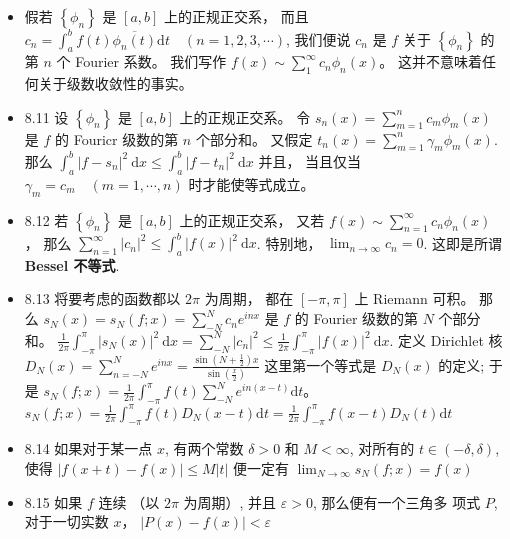 \begin{itemize}
\item 假若 $\left\{\phi_{n}\right\}$ 是 $[a, b]$ 上的正规正交系， 而且 $c_{n}=\int_{a}^{b} f(t) \overline{\phi_{n}(t)} \mathrm{d} t \quad(n=1,2,3, \cdots)$, 我们便说 $c_{n}$ 是 $f$ 关于 $\left\{\phi_{n}\right\}$ 的第 $n$ 个 Fourier 系数。 我们写作 $f(x) \sim \sum_{1}^{\infty} c_{n} \phi_{n}(x)$。 这并不意味着任何关于级数收敛性的事实。

\item 8.11 设 $\left\{\phi_{n}\right\}$ 是 $[a, b]$ 上的正规正交系。 令 $s_{n}(x)=\sum_{m=1}^{n} c_{m} \phi_{m}(x)$ 是 $f$ 的 Fouricr 级数的第 $n$ 个部分和。 又假定 $t_{n}(x)=\sum_{m=1}^{n} \gamma_{m} \phi_{m}(x) .$ 那么 $\int_{a}^{b}\left|f-s_{n}\right|^{2} \mathrm{~d} x \leqslant \int_{a}^{b}\left|f-t_{n}\right|^{2} \mathrm{~d} x$ 并且， 当且仅当 $\gamma_{m}=c_{m} \quad(m=1, \cdots, n)$ 时才能使等式成立。

\item 8.12 若 $\left\{\phi_{n}\right\}$ 是 $[a, b]$ 上的正规正交系， 又若 $f(x) \sim \sum_{n=1}^{\infty} c_{n} \phi_{n}(x)$， 那么 $\sum_{n=1}^{\infty}\left|c_{n}\right|^{2} \leqslant \int_{a}^{b}|f(x)|^{2} \mathrm{~d} x$. 特别地， $\lim _{n \rightarrow \infty} c_{n}=0$. 这即是所谓 \textbf{Bessel 不等式}.

\item 8.13 将要考虑的函数都以 $2 \pi$ 为周期， 都在 $[-\pi, \pi]$ 上 Riemann 可积。 那么 $s_{N}(x)=s_{N}(f ; x)=\sum_{-N}^{N} c_{n} e^{i n x}$ 是 $f$ 的 Fourier 级数的第 $N$ 个部分和。 $\frac{1}{2 \pi} \int_{-\pi}^{\pi}\left|s_{N}(x)\right|^{2} \mathrm{~d} x=\sum_{-N}^{N}\left|c_{n}\right|^{2} \leqslant \frac{1}{2 \pi} \int_{-\pi}^{\pi}|f(x)|^{2} \mathrm{~d} x$. 定义 Dirichlet 核 $D_{N}(x)=\sum_{n=-N}^{N} e^{i n x}=\frac{\sin \left(N+\frac{1}{2}\right) x}{\sin \left(\frac{x}{2}\right)}$ 这里第一个等式是 $D_{N}(x)$ 的定义; 于是 $s_{N}(f ; x) =\frac{1}{2 \pi} \int_{-\pi}^{\pi} f(t) \sum_{-N}^{N} e^{i n(x-t)} \mathrm{d} t$。 $s_{N}(f ; x)= \frac{1}{2 \pi} \int_{-\pi}^{\pi} f(t) D_{N}(x-t) \mathrm{d} t =\frac{1}{2 \pi} \int_{-\pi}^{\pi} f(x-t) D_{N}(t) \mathrm{d} t$

\item 8.14 如果对于某一点 $x$, 有两个常数 $\delta>0$ 和 $M<\infty$, 对所有的 $t \in(-\delta, \delta)$, 使得 $|f(x+t)-f(x)| \leqslant M|t|$ 便一定有 $\lim _{N \rightarrow \infty} s_{N}(f ; x)=f(x)$

\item 8.15 如果 $f$ 连续 （以 $2 \pi$ 为周期）, 并且 $\varepsilon>0$, 那么便有一个三角多 项式 $P$, 对于一切实数 $x$， $|P(x)-f(x)|<\varepsilon$


\end{itemize}

